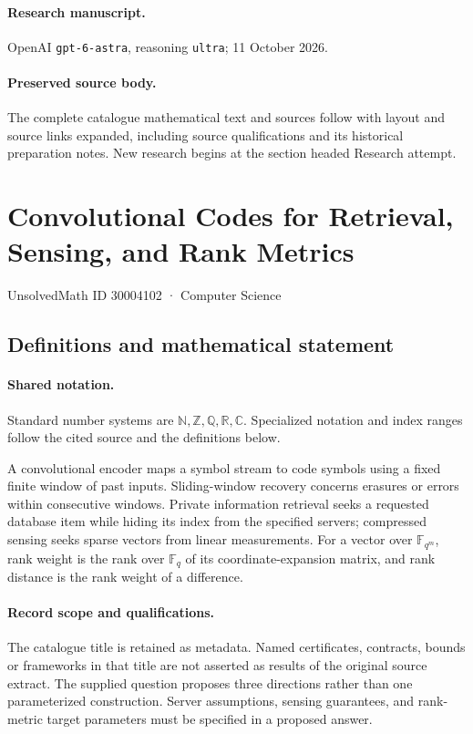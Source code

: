 \documentclass[11pt]{article}
\begin{document}
\paragraph{Research manuscript.} OpenAI \texttt{gpt-6-astra}, reasoning \texttt{ultra}; 11 October 2026.
\paragraph{Preserved source body.} The complete catalogue mathematical text and sources follow with layout and source links expanded, including source qualifications and its historical preparation notes. New research begins at the section headed Research attempt.

\section{Convolutional Codes for Retrieval, Sensing, and Rank Metrics}\label{30004102}
{\small UnsolvedMath ID 30004102 · Computer Science}
\subsection{Definitions and mathematical statement}

\paragraph{Shared notation.}Standard number systems are $\mathbb N,\mathbb Z,\mathbb Q,\mathbb R,\mathbb C$. Specialized notation and index ranges follow the cited source and the definitions below.


A convolutional encoder maps a symbol stream to code symbols using a fixed finite window of past inputs. Sliding-window recovery concerns erasures or errors within consecutive windows. Private information retrieval seeks a requested database item while hiding its index from the specified servers; compressed sensing seeks sparse vectors from linear measurements. For a vector over $\mathbb F_{q^m}$, rank weight is the rank over $\mathbb F_q$ of its coordinate-expansion matrix, and rank distance is the rank weight of a difference.
\paragraph{Record scope and qualifications.}
The catalogue title is retained as metadata. Named certificates, contracts, bounds or frameworks in that title are not asserted as results of the original source extract.
The supplied question proposes three directions rather than one parameterized construction. Server assumptions, sensing guarantees, and rank-metric target parameters must be specified in a proposed answer.
\end{document}
